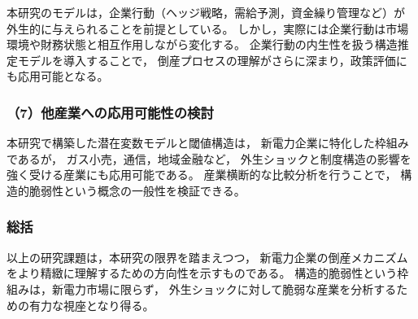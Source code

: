 本研究のモデルは，企業行動（ヘッジ戦略，需給予測，資金繰り管理など）が
外生的に与えられることを前提としている。
しかし，実際には企業行動は市場環境や財務状態と相互作用しながら変化する。
企業行動の内生性を扱う構造推定モデルを導入することで，
倒産プロセスの理解がさらに深まり，政策評価にも応用可能となる。

\subsubsection*{（7）他産業への応用可能性の検討}

本研究で構築した潜在変数モデルと閾値構造は，
新電力企業に特化した枠組みであるが，
ガス小売，通信，地域金融など，
外生ショックと制度構造の影響を強く受ける産業にも応用可能である。
産業横断的な比較分析を行うことで，
構造的脆弱性という概念の一般性を検証できる。

\subsubsection*{総括}

以上の研究課題は，本研究の限界を踏まえつつ，
新電力企業の倒産メカニズムをより精緻に理解するための方向性を示すものである。
構造的脆弱性という枠組みは，新電力市場に限らず，
外生ショックに対して脆弱な産業を分析するための有力な視座となり得る。

